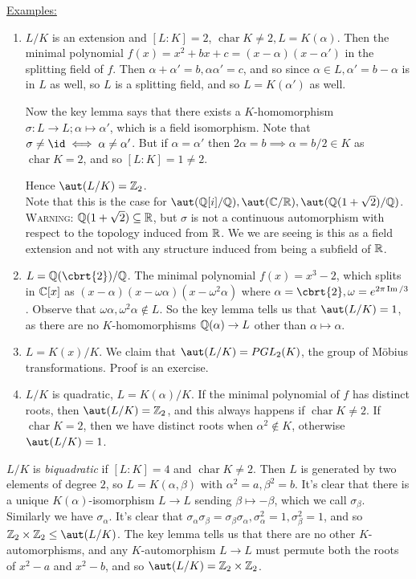 \documentclass[a4paper, 10pt, twocolumn]{amsart}
\renewcommand{\charr}{\operatorname{char}}
\begin{document}
\underline{Examples:}
\begin{enumerate}
\item $L/K$ is an extension and $[L:K] = 2$, $\charr K \neq 2, L = K(\alpha)$. Then the minimal polynomial $f(x) = x^2 + bx + c = (x-\alpha)(x- \alpha')$ in the splitting field of $f$. Then $\alpha+\alpha' = b, \alpha\alpha' = c$, and so since $\alpha \in L, \alpha' = b-\alpha$ is in $L$ as well, so $L$ is a splitting field, and so $L=K(\alpha')$ as well.

Now the key lemma says that there exists a $K$-homomorphism $\sigma:L \to L; \alpha \mapsto \alpha'$, which is a field isomorphism. Note that $\sigma \neq \id \iff \alpha \neq \alpha'$. But if $\alpha = \alpha'$ then $2\alpha = b \implies \alpha = b/2 \in K$ as $\charr K = 2$, and so $[L:K] = 1 \neq 2$.

Hence $\aut(L/K) = \Z_2$. \\
Note that this is the case for $\aut(\Q[i]/\Q), \aut(\C/\R), \aut(\Q(1+\sqrt{2})/\Q)$.\\
\textsc{Warning:} $\mathbb{Q}(1+\sqrt{2})\subseteq \mathbb{R}$, but $\sigma$ is not a continuous automorphism with respect to the topology induced from $\mathbb{R}$. We we are seeing is this as a field extension and not with any structure induced from being a subfield of $\mathbb{R}$.

\item $L = \Q(\cbrt{2}) / \Q$. The minimal polynomial $f(x) = x^3-2$, which splits in $\mathbb{C}[x]$ as $(x-\alpha)(x-\omega\alpha)(x-\omega^2\alpha)$ where $\alpha = \cbrt{2}, \omega= e^{2\pi\im/3}$. Observe that $\omega\alpha, \omega^2 \alpha \notin L$. So the key lemma tells us that $\aut(L/K) = 1$, as there are no $K$-homomorphisms $\mathbb{Q}(\alpha) \to L$ other than $\alpha \mapsto \alpha$. 

\item $L=K(x)/K$. We claim that $\aut(L/K) = PGL_2(K)$, the group of M\"obius transformations. Proof is an exercise.

\item $L/K$ is quadratic, $L=K(\alpha)/K$. If the minimal polynomial of $f$ has distinct roots, then $\aut(L/K) = \Z_2$, and this always happens if $\charr K \neq 2$. If $\charr K = 2$, then we have distinct roots when $\alpha^2 \notin K$, otherwise $\aut(L/K) = 1$.
\end{enumerate}
$L/K$ is \emph{biquadratic} if $[L:K] = 4$ and $\charr K \neq 2$. Then $L$ is generated by two elements of degree $2$, so $L = K(\alpha, \beta)$ with $\alpha^2 = a, \beta^2 = b$.  It's clear that there is a unique $K(\alpha)$-isomorphism $L \to L$ sending $\beta \mapsto -\beta$, which we call $\sigma_\beta$. Similarly we have $\sigma_\alpha$. It's clear that $\sigma_\alpha \sigma_\beta = \sigma_\beta\sigma_\alpha, \sigma_\alpha^2=1, \sigma_\beta^2=1$, and so $\Z_2 \times \Z_2 \leq \aut(L/K)$. The key lemma tells us that there are no other $K$-automorphisms, and any $K$-automorphism $L \to L$ must permute both the roots of $x^2-a$ and $x^2-b$, and so $\aut(L/K) = \Z_2 \times \Z_2$.
\end{document}
